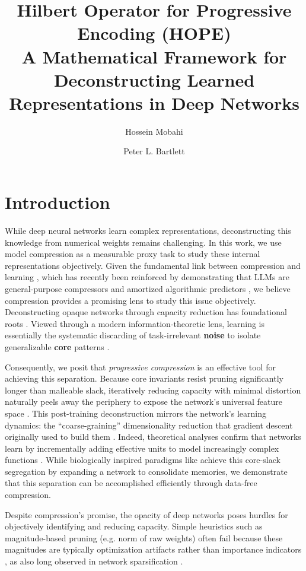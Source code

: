\documentclass[11pt, a4paper, copyright, gdm]{google}
\title{Hilbert Operator for Progressive Encoding (HOPE)\\[1ex]
\normalfont\fontsize{14}{18}\selectfont A Mathematical Framework for Deconstructing Learned Representations in Deep Networks}
\author[1]{Hossein Mobahi}
\author[1,2]{Peter L. Bartlett}
\affil[1]{\thepa{}{}}
\affil[2]{University of California, Berkeley}
\theoremstyle{definition}
\begin{document}
\maketitle

\section{Introduction}
\label{sec:intro}
While deep neural networks learn complex representations, deconstructing this knowledge from numerical weights remains challenging. In this work, we use model compression as a measurable proxy task to study these internal representations objectively. Given the fundamental link between compression and learning \cite{rissanen1978modeling, hinton1993keeping}, which has recently been reinforced by demonstrating that LLMs are general-purpose compressors \cite{Deletang2023} and amortized algorithmic predictors \cite{Genewein2026}, we believe compression provides a promising lens to study this issue objectively. Deconstructing opaque networks through capacity reduction has foundational roots \cite{mozer1989skeletonization}. Viewed through a modern information-theoretic lens, learning is essentially the systematic discarding of task-irrelevant \textbf{noise} to isolate generalizable \textbf{core} patterns \cite{tishby1999information, shwartz2017opening}.

Consequently, we posit that \textit{progressive compression} is an effective tool for achieving this separation. Because core invariants resist pruning significantly longer than malleable slack, iteratively reducing capacity with minimal distortion naturally peels away the periphery to expose the network's universal feature space \cite{he2026demystifyingpruningworksrepresentation, nguyen2026depth, wang2026understanding}. This post-training deconstruction mirrors the network's learning dynamics: the ``coarse-graining'' dimensionality reduction that gradient descent originally used to build them \cite{dandi2025computational}. Indeed, theoretical analyses confirm that networks learn by incrementally adding effective units to model increasingly complex functions \cite{Zhangetal2025}. While biologically inspired paradigms like \cite{behrouz2026languagemodelsneedsleep} achieve this core-slack segregation by expanding a network to consolidate memories, we demonstrate that this separation can be accomplished efficiently through data-free compression.

Despite compression's promise, the opacity of deep networks poses hurdles for objectively identifying and reducing capacity. Simple heuristics such as magnitude-based pruning (e.g. norm of raw weights) often fail because these magnitudes are typically optimization artifacts rather than importance indicators \cite{Scholl2021, Tanaka2020PruningNN, hooker2019what}, as also long observed in network sparsification \cite{lecun1989optimal, hassibi1993optimal, frankle2019lottery}.
\end{document}
